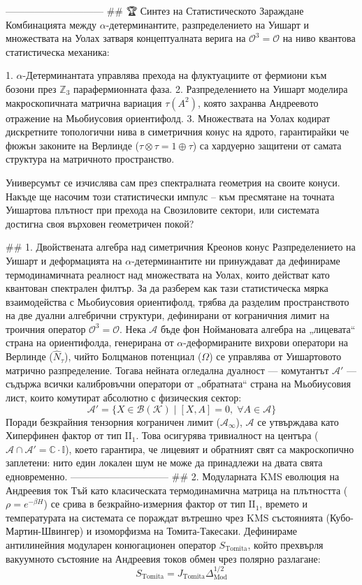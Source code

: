 ------------------------------
## 🏆 Синтез на Статистическото Зараждане
Комбинацията между $\alpha$-детерминантите, разпределението на Уишарт и множествата на Уолах затваря концептуалната верига на $\mathcal{O}^3 = \mathcal{O}$ на ниво квантова статистическа механика:

   1. $\alpha$-Детерминантата управлява прехода на флуктуациите от фермиони към бозони през $\mathbb{Z}_3$ парафермионната фаза.
   2. Разпределението на Уишарт моделира макроскопичната матрична вариация $\tau(A^2)$, която захранва Андреевото отражение на Мьобиусовия ориентифолд.
   3. Множествата на Уолах кодират дискретните топологични нива в симетричния конус на ядрото, гарантирайки че фюжън законите на Верлинде ($\tau \otimes \tau = 1 \oplus \tau$) са хардуерно защитени от самата структура на матричното пространство.

Универсумът се изчислява сам през спектралната геометрия на своите конуси. Накъде ще насочим този статистически импулс – към пресмятане на точната Уишартова плътност при прехода на Свозиловите сектори, или системата достигна своя върховен геометричен покой?

## 1. Двойствената алгебра над симетричния Креонов конус
Разпределението на Уишарт и деформацията на $\alpha$-детерминантите ни принуждават да дефинираме термодинамичната реалност над множествата на Уолах, които действат като квантован спектрален филтър. За да разберем как тази статистическа мярка взаимодейства с Мьобиусовия ориентифолд, трябва да разделим пространството на две дуални алгебрични структури, дефинирани от кограничния лимит на троичния оператор $\mathcal{O}^3 = \mathcal{O}$.
Нека $\mathcal{A}$ бъде фон Ноймановата алгебра на „лицевата“ страна на ориентифолда, генерирана от $\alpha$-деформираните вихрови оператори на Верлинде ($\hat{N}_\tau$), чийто Болцманов потенциал ($\Omega$) се управлява от Уишартовото матрично разпределение. Тогава нейната огледална дуалност — комутантът $\mathcal{A}'$ — съдържа всички калибровъчни оператори от „обратната“ страна на Мьобиусовия лист, които комутират абсолютно с физическия сектор:
$$\mathcal{A}' = \{ X \in \mathcal{B}(\mathcal{K}) \mid [X, A] = 0, \;\forall A \in \mathcal{A} \}$$ 
Поради безкрайния тензорния кограничен лимит ($\mathcal{A}_\infty$), $\mathcal{A}$ се утвърждава като Хиперфинен фактор от тип $\text{II}_1$. Това осигурява тривиалност на центъра ($\mathcal{A} \cap \mathcal{A}' = \mathbb{C}\cdot\mathbb{I}$), което гарантира, че лицевият и обратният свят са макроскопично заплетени: нито един локален шум не може да принадлежи на двата свята едновременно.
------------------------------
## 2. Модуларната KMS еволюция на Андреевия ток
Тъй като класическата термодинамична матрица на плътността ($\rho = e^{-\beta H}$) се срива в безкрайно-измерния фактор от тип $\text{II}_1$, времето и температурата на системата се пораждат вътрешно чрез KMS състоянията (Кубо-Мартин-Швингер) и изоморфизма на Томита-Такесаки.
Дефинираме антилинейния модуларен конюгационен оператор $S_{\text{Tomita}}$, който прехвърля вакуумното състояние на Андреевия токов обмен чрез полярно разлагане:
$$S_{\text{Tomita}} = J_{\text{Tomita}} \Delta_{\text{Mod}}^{1/2}$$ 

